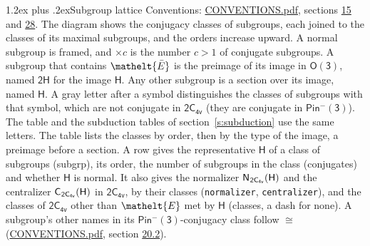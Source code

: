 \documentclass[10pt,a4paper]{article}
\makeatletter
\renewcommand\section{\@startsection{section}{1}{\z@}{-3ex plus -1ex minus -.2ex}%
  {1.2ex plus .2ex}{\normalfont\large\sffamily\bfseries\color{parttitle}}}
\numberwithin{equation}{section}
\newcommand{\eltfont}[1]{{\let\sigma\eltsigma\mathelt{#1}}}
\newcommand{\grp}[1]{\mathsf{#1}}
\newcommand{\cls}[1]{\eltfont{#1}}
\newcommand{\elt}[1]{\eltfont{#1}}
\newcommand{\samecls}{\cong}
\newcommand{\barred}[1]{\bar{#1}}
\newcommand{\hairsp}{\mkern1mu}
\makeatother
\begin{document}
\section{Subgroup lattice}\label{s:subgroups}
Conventions: \href{../../CONVENTIONS.pdf}{CONVENTIONS.pdf}, sections \href{../../../rotation/CONVENTIONS.pdf\#conv.15}{15} and \href{../../CONVENTIONS.pdf\#conv.28}{28}.
The diagram shows the conjugacy classes of subgroups, each joined to the classes of its maximal subgroups, and the orders increase upward. \label{n:index.conjugates.c}\label{n:mark.conjugates}A normal subgroup is framed, and ${\times}c$ is the number $c > 1$ of conjugate subgroups. \label{n:group.H}A subgroup that contains $\elt{\barred{E}}$ is the preimage of its image in $\grp{O(3)}$, named $\grp{2H}$ for the image $\grp{H}$. Any other subgroup is a section over its image, named $\grp{H}$. \label{n:mark.letter}A gray letter after a symbol distinguishes the classes of subgroups with that symbol, which are not conjugate in $\grp{2C_{4v}}$ (they are conjugate in \href{Pinminus3.pdf}{$\grp{Pin^{-}(3)}$}). The table and the subduction tables of section~\ref{s:subduction} use the same letters. The table lists the classes by order, then by the type of the image, a preimage before a section. \label{n:head.subgroup}\label{n:head.order}\label{n:head.conjugates}\label{n:head.normal}A row gives the representative $\grp{H}$ of a class of subgroups (subgrp), its order, the number of subgroups in the class (conjugates) and whether $\grp{H}$ is normal. \label{n:group.normalizer}\label{n:group.centralizer}\label{n:head.classes}It also gives the normalizer $\grp{N}_{\hairsp \grp{2C_{4v}}}(\grp{H})$ and the centralizer $\grp{C}_{\hairsp \grp{2C_{4v}}}(\grp{H})$ in $\grp{2C_{4v}}$, by their classes (\texttt{normalizer}, \texttt{centralizer}), and the classes of $\grp{2C_{4v}}$ other than $\cls{E}$ met by $\grp{H}$ (classes, a dash for none). A subgroup's other names in its \href{Pinminus3.pdf}{$\grp{Pin^{-}(3)}$}-conjugacy class follow $\samecls$ (\href{../../CONVENTIONS.pdf}{CONVENTIONS.pdf}, section \href{../../CONVENTIONS.pdf\#conv.20.2}{20.2}).
\end{document}
